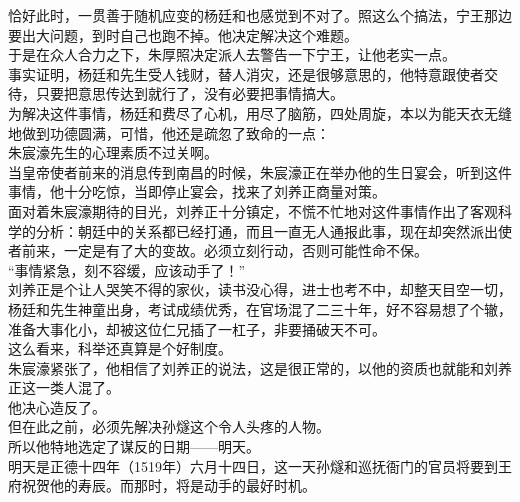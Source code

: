 \begin{multicols}{\theparacolNo}
恰好此时，一贯善于随机应变的杨廷和也感觉到不对了。照这么个搞法，宁王那边要出大问题，到时自己也跑不掉。他决定解决这个难题。\\

于是在众人合力之下，朱厚照决定派人去警告一下宁王，让他老实一点。\\

事实证明，杨廷和先生受人钱财，替人消灾，还是很够意思的，他特意跟使者交待，只要把意思传达到就行了，没有必要把事情搞大。\\

为解决这件事情，杨廷和费尽了心机，用尽了脑筋，四处周旋，本以为能天衣无缝地做到功德圆满，可惜，他还是疏忽了致命的一点：\\

朱宸濠先生的心理素质不过关啊。\\

当皇帝使者前来的消息传到南昌的时候，朱宸濠正在举办他的生日宴会，听到这件事情，他十分吃惊，当即停止宴会，找来了刘养正商量对策。\\

面对着朱宸濠期待的目光，刘养正十分镇定，不慌不忙地对这件事情作出了客观科学的分析：朝廷中的关系都已经打通，而且一直无人通报此事，现在却突然派出使者前来，一定是有了大的变故。必须立刻行动，否则可能性命不保。\\

“事情紧急，刻不容缓，应该动手了！”\\

刘养正是个让人哭笑不得的家伙，读书没心得，进士也考不中，却整天目空一切，杨廷和先生神童出身，考试成绩优秀，在官场混了二三十年，好不容易想了个辙，准备大事化小，却被这位仁兄插了一杠子，非要捅破天不可。\\

这么看来，科举还真算是个好制度。\\

朱宸濠紧张了，他相信了刘养正的说法，这是很正常的，以他的资质也就能和刘养正这一类人混了。\\

他决心造反了。\\

但在此之前，必须先解决孙燧这个令人头疼的人物。\\

所以他特地选定了谋反的日期——明天。\\

明天是正德十四年（1519年）六月十四日，这一天孙燧和巡抚衙门的官员将要到王府祝贺他的寿辰。而那时，将是动手的最好时机。\\


\end{multicols}

